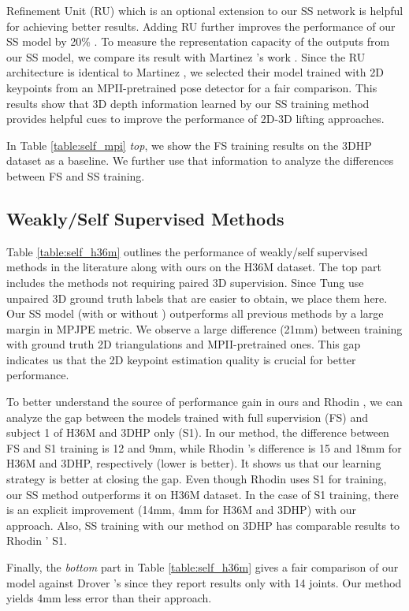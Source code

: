 \documentclass[10pt,twocolumn,letterpaper]{article}
\begin{document}
Refinement Unit (RU) which is an optional extension to our SS network is helpful for achieving better results. Adding RU further improves the performance of our SS model by 20\% . To measure the representation capacity of the outputs from our SS model, we compare its result with Martinez \etal’s work \cite{martinez_2017_3dbaseline}. Since the RU architecture is identical to Martinez \etal, we selected their model trained with 2D keypoints from an MPII-pretrained pose detector for a fair comparison. This results show that 3D depth information learned by our SS training method provides helpful cues to improve the performance of 2D-3D lifting approaches.

In Table \ref{table:self_mpi} \textit{top}, we show the FS training results on the 3DHP dataset as a baseline. We further use that information to analyze the differences between FS and SS training.   
\subsection*{Weakly/Self Supervised Methods}
Table \ref{table:self_h36m} outlines the performance of weakly/self supervised methods in the literature along with ours on the H36M dataset. The top part includes the methods not requiring paired 3D supervision. Since Tung \etal \cite{tung2017} use unpaired 3D ground truth labels that are easier to obtain, we place them here. Our SS model (with or without ) outperforms all previous methods \cite{tung2017,pavlakos2017harvesting} by a large margin in MPJPE metric. We observe a large difference (21mm) between training with ground truth 2D triangulations and MPII-pretrained ones. This gap indicates us that the 2D keypoint estimation quality is crucial for better performance.

To better understand the source of performance gain in ours and Rhodin \etal, we can analyze the gap between the models trained with full supervision (FS) and subject 1 of H36M and 3DHP only (S1). In our method, the difference between FS and S1 training is 12 and 9mm, while Rhodin \etal’s difference is 15 and 18mm for H36M and 3DHP, respectively (lower is better). It shows us that our learning strategy is better at closing the gap. Even though Rhodin \etal uses S1 for training, our SS method outperforms it on H36M dataset. In the case of S1 training, there is an explicit improvement (14mm, 4mm for H36M and 3DHP) with our approach. Also, SS training with our method on 3DHP has comparable results to Rhodin \etal’ S1. 

Finally, the \textit{bottom} part in Table \ref{table:self_h36m} gives a fair comparison of our model against Drover \etal’s since they report results only with 14 joints. Our method yields 4mm less error than their approach.
\end{document}
